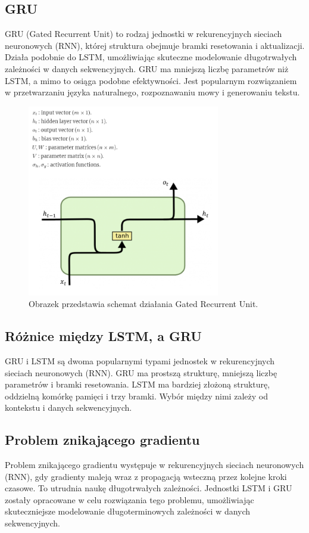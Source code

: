 \documentclass{article}
\begin{document}
    \subsection{GRU}
    GRU (Gated Recurrent Unit) to rodzaj jednostki w rekurencyjnych sieciach neuronowych (RNN), której struktura obejmuje bramki resetowania i aktualizacji. Działa podobnie do LSTM, umożliwiając skuteczne modelowanie długotrwałych zależności w danych sekwencyjnych. GRU ma mniejszą liczbę parametrów niż LSTM, a mimo to osiąga podobne efektywności. Jest popularnym rozwiązaniem w przetwarzaniu języka naturalnego, rozpoznawaniu mowy i generowaniu tekstu.
    \begin{figure}[h]
        \centering
        \includegraphics[width=0.75\textwidth]{images/rnn.png}
        \caption{Obrazek przedstawia schemat działania Gated Recurrent Unit.}
        \label{fig:mesh1}
    \end{figure}
    \pagebreak
    \subsection{Różnice między LSTM, a GRU}
    GRU i LSTM są dwoma popularnymi typami jednostek w rekurencyjnych sieciach neuronowych (RNN). GRU ma prostszą strukturę, mniejszą liczbę parametrów i bramki resetowania. LSTM ma bardziej złożoną strukturę, oddzielną komórkę pamięci i trzy bramki. Wybór między nimi zależy od kontekstu i danych sekwencyjnych.
    \subsection{Problem znikającego gradientu}
    Problem znikającego gradientu występuje w rekurencyjnych sieciach neuronowych (RNN), gdy gradienty maleją wraz z propagacją wsteczną przez kolejne kroki czasowe. To utrudnia naukę długotrwałych zależności. Jednostki LSTM i GRU zostały opracowane w celu rozwiązania tego problemu, umożliwiając skuteczniejsze modelowanie długoterminowych zależności w danych sekwencyjnych.
\end{document}
